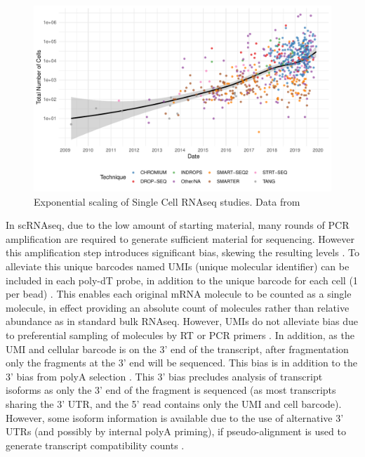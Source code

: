 \begin{figure}[H]
	\centering
	\includegraphics[width=\textwidth]{figures/intro/scStudies.pdf}
	\caption[scRNAseq Publications]{Exponential scaling of Single Cell RNAseq studies. Data from~\cite{Svensson2019curated}}
	\label{fig:scStudies}
\end{figure}

In scRNAseq, due to the low amount of starting material, many rounds of PCR amplification are required to generate sufficient material for sequencing.
However this amplification step introduces significant bias, skewing the resulting levels \parencite{Best2015Computational}.
To alleviate this unique barcodes named UMIs (unique molecular identifier) can be included in each poly-dT probe, in addition to the unique barcode for each cell (1 per bead) \parencite{Kivioja2012Counting,Islam2014Quantitative}.
This enables each original mRNA molecule to be counted as a single molecule, in effect providing an absolute count of molecules rather than relative abundance as in standard bulk RNAseq.
However, UMIs do not alleviate bias due to preferential sampling of molecules by RT or PCR primers \parencite{Kou2016Benefits}.
In addition, as the UMI and cellular barcode is on the 3' end of the transcript, after fragmentation only the fragments at the 3' end will be sequenced.
This bias is in addition to the 3' bias from polyA selection \parencite{Wan2012Modeling, Lahens2014IVTseq}.
This 3' bias precludes analysis of transcript isoforms as only the 3' end of the fragment is sequenced (as most transcripts sharing the 3' UTR, and the 5' read contains only the UMI and cell barcode).
However, some isoform information is available due to the use of alternative 3' UTRs (and possibly by internal polyA priming), if pseudo-alignment is used to generate transcript compatibility counts \parencite{Nam2002Oligo, Ntranos2019discriminative}.


